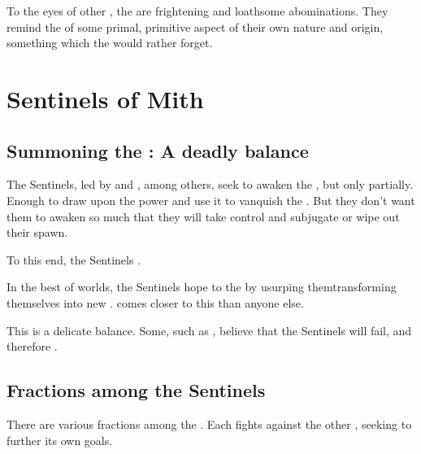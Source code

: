 To the eyes of other \scathae, the \troglodytes{} are frightening and loathsome abominations. They remind the \scathae{} of some primal, primitive aspect of their own nature and origin, something which the \scathae{} would rather forget. 















\section{Sentinels of Mith}
\label{Sentinels}
\label{Sentinels of Mith}
\subsection{Summoning the \xss: A deadly balance}
\label{Summoning the \xss: A deadly balance}
The Sentinels, led by \Secherdamon{} and \Vizsherioch, among others, seek to awaken the \xss, but only partially. Enough to draw upon the \xssz{} power and use it to vanquish the \banes. But they don't want them to awaken so much that they will take control and subjugate or wipe out their \draconic{} spawn. 

To this end, the Sentinels . 

\label{\Dragons{} want to usurp the \xss}
In the best of worlds, the Sentinels hope to  the \xss{} by usurping them\dash transforming themselves into new \xss. \Vizsherioch{} comes closer to this than anyone else.

This is a delicate balance. Some, such as \Ishnaruchaefir, believe that the Sentinels will fail, and therefore .









\subsection{Fractions among the Sentinels}
There are various fractions among the \dragons. Each \draconic{} \bloodline{} fights against the other \bloodlines, seeking to further its own goals. 

